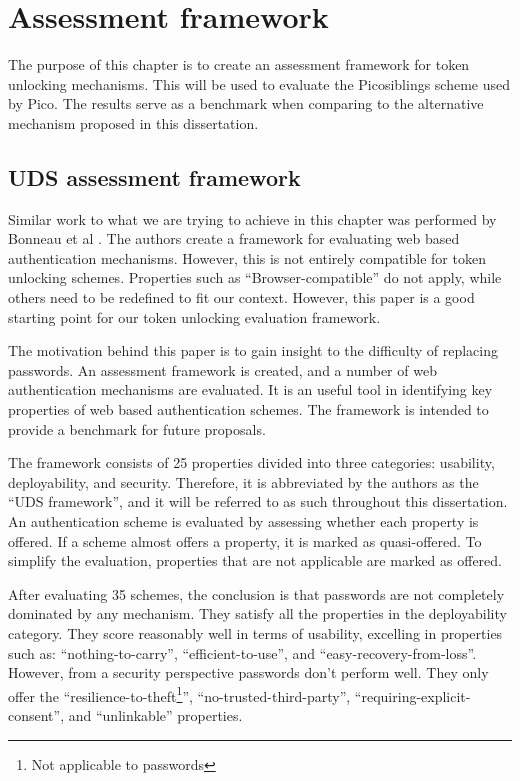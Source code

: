 
\chapter{Assessment framework}

\label{Chapter5}


The purpose of this chapter is to create an assessment framework for token unlocking mechanisms. This will be used to evaluate the Picosiblings scheme used by Pico. The results serve as a benchmark when comparing to the alternative mechanism proposed in this dissertation.

\section{UDS assessment framework}

Similar work to what we are trying to achieve in this chapter was performed by Bonneau et al \cite{bonneau2012quest}. The authors create a framework for evaluating web based authentication mechanisms. However, this is not entirely compatible for token unlocking schemes. Properties such as ``Browser-compatible'' do not apply, while others need to be redefined to fit our context. However, this paper is a good starting point for our token unlocking evaluation framework.

The motivation behind this paper is to gain insight to the difficulty of replacing passwords. An assessment framework is created, and a number of web authentication mechanisms are evaluated. It is an useful tool in identifying key properties of web based authentication schemes. The framework is intended to provide a benchmark for future proposals.

The framework consists of 25 properties divided into three categories: usability, deployability, and security. Therefore, it is abbreviated by the authors as the ``UDS framework'', and it will be referred to as such throughout this dissertation. An authentication scheme is evaluated by assessing whether each property is offered. If a scheme almost offers a property, it is marked as quasi-offered. To simplify the evaluation, properties that are not applicable are marked as offered.

After evaluating 35 schemes, the conclusion is that passwords are not completely dominated by any mechanism. They satisfy all the properties in the deployability category. They score reasonably well in terms of usability, excelling in properties such as: ``nothing-to-carry'', ``efficient-to-use'', and ``easy-recovery-from-loss''. However, from a security perspective passwords don't perform well. They only offer the ``resilience-to-theft\footnote{Not applicable to passwords}'', ``no-trusted-third-party'', ``requiring-explicit-consent'', and ``unlinkable'' properties.

